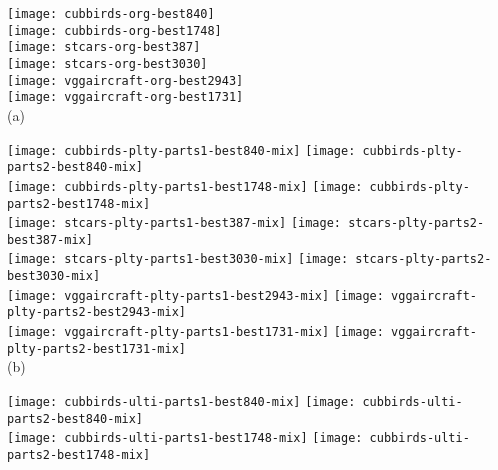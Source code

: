 \documentclass[10pt,twocolumn,letterpaper]{article}
\begin{document}
\begin{figure*}[t]
\begin{center}
\begin{minipage}{0.095\linewidth}
\texttt{[image: cubbirds-org-best840]}\\
\texttt{[image: cubbirds-org-best1748]}\\
\texttt{[image: stcars-org-best387]}\\
\texttt{[image: stcars-org-best3030]}\\
\texttt{[image: vggaircraft-org-best2943]}\\
\texttt{[image: vggaircraft-org-best1731]}\\
\centering (a)
\end{minipage}
\begin{minipage}{0.21\linewidth}
\texttt{[image: cubbirds-plty-parts1-best840-mix]}
\texttt{[image: cubbirds-plty-parts2-best840-mix]}\\
\texttt{[image: cubbirds-plty-parts1-best1748-mix]}
\texttt{[image: cubbirds-plty-parts2-best1748-mix]}\\
\texttt{[image: stcars-plty-parts1-best387-mix]}
\texttt{[image: stcars-plty-parts2-best387-mix]}\\
\texttt{[image: stcars-plty-parts1-best3030-mix]}
\texttt{[image: stcars-plty-parts2-best3030-mix]}\\
\texttt{[image: vggaircraft-plty-parts1-best2943-mix]}
\texttt{[image: vggaircraft-plty-parts2-best2943-mix]}\\
\texttt{[image: vggaircraft-plty-parts1-best1731-mix]}
\texttt{[image: vggaircraft-plty-parts2-best1731-mix]}\\
\centering (b)
\end{minipage}
\begin{minipage}{0.21\linewidth}
\texttt{[image: cubbirds-ulti-parts1-best840-mix]}
\texttt{[image: cubbirds-ulti-parts2-best840-mix]}\\
\texttt{[image: cubbirds-ulti-parts1-best1748-mix]}
\texttt{[image: cubbirds-ulti-parts2-best1748-mix]}\\

\end{minipage}
\end{center}
\end{figure*}
\end{document}
